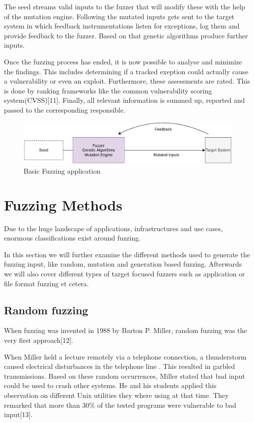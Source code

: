 \documentclass[journal=tosc,final]{iacrtrans}
\begin{document}
The seed streams valid inputs to the fuzzer that will modify these with the help of the mutation engine. Following the mutated inputs gets sent to the target system in which feedback instrumentations listen for exceptions, log them and provide feedback to the fuzzer. Based on that genetic algorithms produce further inputs.

Once the fuzzing process has ended, it is now possible to analyse and minimize the findings. This includes determining if a tracked exeption could actually cause a vulnerability or even an exploit. Furthermore, these assessments are rated. This is done by ranking frameworks like the common vulnerability scoring system(CVSS)[11]. Finally, all relevant information is summed up, reported and passed to the corresponding responsible. 
\begin{figure}
\caption{Basic Fuzzing application}
 \begin{shaded}

\begin{center}
\includegraphics[scale=0.2]{../final2.png}
\end{center}
\end{shaded}

\end{figure}

\section{Fuzzing Methods}
Due to the huge landscape of applications, infrastructures and use cases, enormous classifications exist around fuzzing. 

In this section we will further examine the different methods used to generate the fuzzing input, like random, mutation and generation based fuzzing. Afterwards we will also cover different types of target focused fuzzers such as application or file format fuzzing et cetera. 
\subsection{Random fuzzing}
When fuzzing was invented in 1988 by Barton P. Miller, random fuzzing was the very first approach[12].

When Miller held a lecture remotely via a telephone connection, a thunderstorm caused electrical disturbances in the telephone line . This resulted in garbled transmissions. Based on these random occurrences, Miller stated that bad input  could be used to crash other systems. He and his students applied this observation on different Unix utilities they where using at that time. They remarked that  more than 30\% of the tested programs were vulnerable to bad input[13]. 
\end{document}
